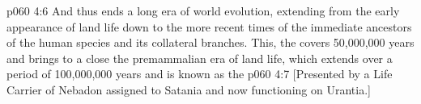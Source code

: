 \vs p060 4:6 \pc And thus ends a long era of world evolution, extending from the early appearance of land life down to the more recent times of the immediate ancestors of the human species and its collateral branches. This, the  covers 50,000,000 years and brings to a close the premammalian era of land life, which extends over a period of 100,000,000 years and is known as the 
\vsetoff
\vs p060 4:7 [Presented by a Life Carrier of Nebadon assigned to Satania and now functioning on Urantia.]
\quizlink

